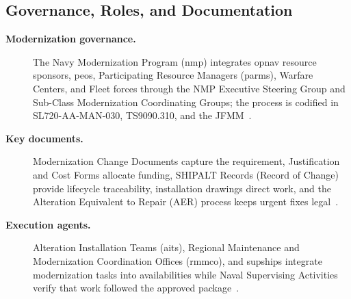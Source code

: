 \documentclass[../main.tex]{subfiles}
\begin{document}
\subsection{Governance, Roles, and Documentation}
\begin{description}
\item[\textbf{Modernization governance.}] The Navy Modernization Program (\ac{nmp}) integrates \ac{opnav} resource sponsors, \acp{peo}, Participating Resource Managers (\acp{parm}), Warfare Centers, and Fleet forces through the NMP Executive Steering Group and Sub-Class Modernization Coordinating Groups; the process is codified in SL720-AA-MAN-030, TS9090.310, and the JFMM~\autocite{SL720-AA-MAN-030,TS9090-310,COMFLTFORCOMINST4790-3}.
\item[\textbf{Key documents.}] Modernization Change Documents capture the requirement, Justification and Cost Forms allocate funding, SHIPALT Records (Record of Change) provide lifecycle traceability, installation drawings direct work, and the Alteration Equivalent to Repair (AER) process keeps urgent fixes legal~\autocite{TS9090-310,edo-4-1-2-navy-modernization-2025}.
\item[\textbf{Execution agents.}] Alteration Installation Teams (\acp{ait}), Regional Maintenance and Modernization Coordination Offices (\ac{rmmco}), and \acp{supship} integrate modernization tasks into availabilities while Naval Supervising Activities verify that work followed the approved package~\autocite{SL720-AA-MAN-030,TS9090-310}.
\end{description}
\end{document}
